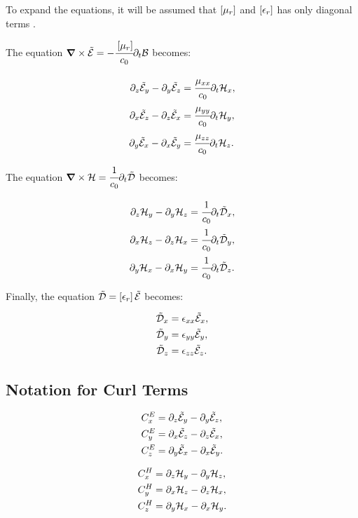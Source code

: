 To expand the equations, it will be assumed that $\brackets{\mu_r}$ and $\brackets{\epsilon_r}$ has only diagonal terms \cite{rumpf_book}. 

The equation $\rot \En = - \cfrac{\brackets{\mu_r}}{c_0} \partial _t \Bt$ becomes:

\begin{align}
    \partial_z\tilde{\mathcal{E}}_y - \partial_y\tilde{\mathcal{E}}_z &= \cfrac{\mu_{xx}}{c_0} \partial_t \mathcal{H}_x, \\
    \partial_x\tilde{\mathcal{E}}_z - \partial_z\tilde{\mathcal{E}}_x &= \cfrac{\mu_{yy}}{c_0} \partial_t \mathcal{H}_y,\\
    \partial_y\tilde{\mathcal{E}}_x - \partial_x\tilde{\mathcal{E}}_y &= \cfrac{\mu_{zz}}{c_0} \partial_t \mathcal{H}_z.
\end{align}

The equation $\bm{\nabla}\times \mathcal{H} = \cfrac{1}{c_0} \partial _t \tilde{\mathcal{D}}$ becomes:

\begin{align}
    \partial_z\mathcal{H}_y - \partial_y\mathcal{H}_z &= \cfrac{1}{c_0} \partial_t \tilde{\mathcal{D}}_x, \\
    \partial_x\mathcal{H}_z - \partial_z\mathcal{H}_x &= \cfrac{1}{c_0} \partial_t \tilde{\mathcal{D}}_y, \\
    \partial_y\mathcal{H}_x - \partial_x\mathcal{H}_y &= \cfrac{1}{c_0} \partial_t \tilde{\mathcal{D}}_z.
\end{align}

Finally, the equation $ \Dn = \brackets{\epsilon_r} \En $ becomes:

\begin{align}
    \tilde{\mathcal{D}}_x &= \epsilon_{xx} \tilde{\mathcal{E}}_x, \label{eq:Dn_x}\\
    \tilde{\mathcal{D}}_y &= \epsilon_{yy} \tilde{\mathcal{E}}_y, \label{eq:Dn_y}\\
    \tilde{\mathcal{D}}_z &= \epsilon_{zz} \tilde{\mathcal{E}}_z. \label{eq:Dn_z}
\end{align}

\subsection{Notation for Curl Terms}

\begin{align}
    C_x^E &= \partial_z\tilde{\mathcal{E}}_y - \partial_y\tilde{\mathcal{E}}_z, \\
    C_y^E &= \partial_x\tilde{\mathcal{E}}_z - \partial_z\tilde{\mathcal{E}}_x, \\
    C_z^E &= \partial_y\tilde{\mathcal{E}}_x - \partial_x\tilde{\mathcal{E}}_y.
\end{align}

\begin{align}
    C_x^H &= \partial_z\mathcal{H}_y - \partial_y\mathcal{H}_z, \\
    C_y^H &= \partial_x\mathcal{H}_z - \partial_z\mathcal{H}_x, \\
    C_z^H &= \partial_y\mathcal{H}_x - \partial_x\mathcal{H}_y.
\end{align}

